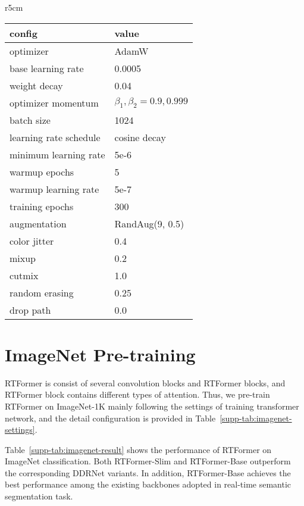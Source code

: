 \documentclass{article}
\begin{document}
{\small


}


\clearpage
\appendix

\begin{wraptable}[18]{r}{5cm}
\caption{Training settings on ImageNet classification.}
\footnotesize
\begin{tabular}{l|l}
\toprule
config & value \\
\hline
optimizer & AdamW \\
base learning rate & 0.0005\\
weight decay & 0.04\\
optimizer momentum & $\beta_1, \beta_2{=}0.9, 0.999$ \\
batch size & 1024 \\
learning rate schedule & cosine decay \\
minimum learning rate & 5e-6 \\
warmup epochs & 5 \\
warmup learning rate & 5e-7 \\
training epochs & 300  \\
augmentation & RandAug(9, 0.5) \\
color jitter & 0.4 \\
mixup & 0.2 \\
cutmix & 1.0 \\
random erasing & 0.25 \\
drop path & 0.0\\
\bottomrule
\end{tabular}
\label{supp-tab:imagenet-settings}
\end{wraptable}

\section{ImageNet Pre-training}

RTFormer is consist of several convolution blocks and RTFormer blocks, and RTFormer block contains different types of attention. Thus, we pre-train RTFormer on ImageNet-1K\cite{deng2009imagenet} mainly following the settings of training transformer network\cite{liu2021swin}, and the detail configuration is provided in Table~\ref{supp-tab:imagenet-settings}.

Table~\ref{supp-tab:imagenet-result} shows the performance of RTFormer on ImageNet classification. Both RTFormer-Slim and RTFormer-Base outperform the corresponding DDRNet variants. In addition, RTFormer-Base achieves the best performance among the existing backbones adopted in real-time semantic segmentation task.
\end{document}
